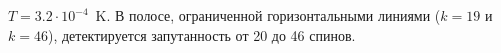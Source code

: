 $T=3.2\cdot10^{-4}$~K.
В полосе, ограниченной горизонтальными линиями ($k=19$ и $k=46$),
детектируется запутанность от 20 до 46 спинов.
